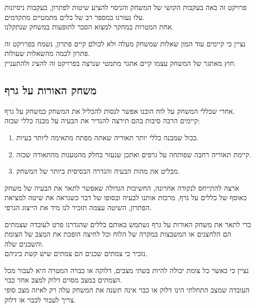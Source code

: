 \documentclass[12pt,twoside]{article}
\begin{document}
פרויקט זה באה בעקבות הקושי של המשחק
והניסוי להציע שיטות לפתרון, בעקבות ניסיונות עלו
נעזרנו במספר רב של כלים מתמטיים מתקדמים.
\\
אחת המטרות במחקר למצוא הסבר לתופעות במשחק שנתקלנו.

נציין כי קיימים עוד המון שאלות שמשחק מעלה ולא לכולם קיים פתרון,
נשמח בפרויקט זה פתרון לכמה מהשאלות שעולות.
\\
חוץ מאתגר של המשחק עצמו קיים אתגר מתמטי שנרצה בפרויקט זה להציג ולהתעניין.


\subsection{ משחק האורות על גרף}
אחרי שכללי המשחק על לוח הובנו אפשר לנסות להכליל את המשחק כמשחק על גרף.
\\
קיימים הרבה סיבות בהם תירצה להגדיר את הבעיה על מבנה כללי שכזה:

\begin{enumerate}
    \item 
    ככול שמבנה כללי יותר תאוריה שאתה מפתח מתאימה ליותר בעיות.
    \item 
    קיימת תאוריה רחבה שפותחה על גרפים ואתכן שנעזר בחלק
    מהטענות מהתאורה שכזה.
    \item 
    מבליט את מהות הבעיה והגדרה הבסיסית ביותר של המשחק.
\end{enumerate}

ארצה להתייחס לנקודה אחרונה, החשיבות הגדולה שאפשר לתאר את הבעיה של משחק
כאוסף של כללים על גרף, מרכזת אותנו לבעיה ובסופו של דבר כשנראה את שיטה למציאת
הפתרון, השיטה עצמה תזכיר לנו מיד את הייצוג הגרפי.

כדי לתאר את משחק האורות על גרף נשתמש באותם כללים שהגדרנו פרט לעובדה
שצמתים הם הלחצנים או המשבצות במקרה של הלוח
וכל לחיצה הופכת את המצב של הצומת והשכנים שלה.
\\
נזכיר כי צמתים שכנים הם צמתים שיש
קשת ביניהם.

נציין כי כאשר כל צומת יכולה להיות בשתי מצבים,
דלוקה או כבויה המטרה היא לעבור מכל הצמתים במצב מסוים דלוק למצב אחר כבוי.
\\
העובדה שמצב התחלתי הינו דלוק או כבוי אינה תשנה את המשחק עלה רק לאיזה מצב סופי צריך לעבור
לכבוי או דלוק.
\end{document}
